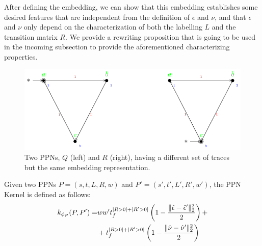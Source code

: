 After defining the embedding, we can show that this embedding establishes some desired features that are independent from the definition of $\epsilon$ and $\nu$, and that $\epsilon$ and $\nu$ only depend on the characterization of both the labelling $L$ and the transition matrix $R$. We provide a rewriting proposition that is going to be used in the incoming subsection to  provide the aforementioned characterizing properties.

\begin{figure}
	\centering
	\includegraphics[scale=.8]{images/counterexample.pdf}
	\caption{Two PPNs, $Q$ (left) and $R$ (right), having a different set of traces but the same embedding representation.}\label{fig:counterexample}
\end{figure}
\begin{proposition}\label{lem:rewritinglemma}
Given two PPNs $P=(s,t,L,R,w)$ and $P'=(s',t',L',R',w')$, the PPN Kernel is defined as follows:
$$\begin{aligned}
k_{\phi_{\mathcal{P}}}(P,P')=&ww't_f^{|R>0|+|R'>0|}\left(1-\frac{\|\hat{\epsilon}-\hat{\epsilon}'\|_{2}^2}{2}\right)+\\
	&+t_f^{|R>0|+|R'>0|}\left(1-\frac{\|\hat{\nu}-\hat{\nu}'\|_{2}^2}{2}\right)\\
\end{aligned}$$
\end{proposition}
